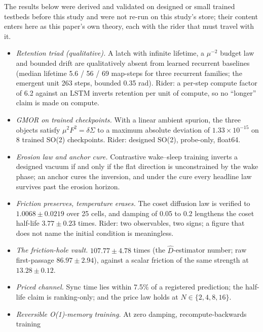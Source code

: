 \documentclass{article} %
\newcommand{\sci}[2]{\ensuremath{#1\times10^{#2}}}
\begin{document}
The results below were derived and validated on designed or small trained testbeds before this
study and were not re-run on this study's store; their content enters here as this paper's own
theory, each with the rider that must travel with it. %
\begin{itemize}[leftmargin=*,itemsep=1pt]
\item \emph{Retention triad (qualitative).} A latch with infinite lifetime, a $\mu^{-2}$ budget
  law and bounded drift are qualitatively absent from learned recurrent baselines (median lifetime 5.6
  / 56 / 69 map-steps for three recurrent families; the emergent unit 263 steps, bounded 0.35 rad).
  Rider: a per-step compute factor of 6.2 against an LSTM inverts retention per unit of compute, so
  no ``longer'' claim is made on compute. %
\item \emph{GMOR on trained checkpoints.} With a linear ambient spurion, the three objects satisfy
  $\mu^2F^2=\delta\Sigma$ to a maximum absolute deviation of \sci{1.33}{-15} on 8 trained SO(2)
  checkpoints. Rider: designed SO(2), probe-only, float64. %
\item \emph{Erosion law and anchor cure.} Contrastive wake--sleep training inverts a designed
  vacuum if and only if the flat direction is unconstrained by the wake phase; an anchor cures the
  inversion, and under the cure every headline law survives past the erosion horizon. %
\item \emph{Friction preserves, temperature erases.} The coset diffusion law is verified to
  $1.0068\pm0.0219$ over 25 cells, and damping of 0.05 to 0.2 lengthens the coset half-life
  $3.77\pm0.23$ times. Rider: two observables, two signs; a figure that does not name the initial
  condition is meaningless. %
\item \emph{The friction-hole vault.} $107.77\pm4.78$ times (the $\hat D$-estimator number; raw
  first-passage $86.97\pm2.94$), against a scalar friction of the same strength at
  $13.28\pm0.12$. %
\item \emph{Priced channel.} Sync time lies within 7.5\% of a registered prediction; the half-life
  claim is ranking-only; and the price law holds at $N\in\{2,4,8,16\}$. %
\item \emph{Reversible O(1)-memory training.} At zero damping, recompute-backwards training

\end{itemize}
\end{document}
